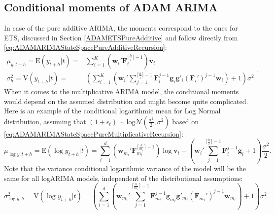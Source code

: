 \documentclass[
]{book}
\theoremstyle{definition}
\theoremstyle{definition}
\theoremstyle{definition}
\theoremstyle{definition}
\theoremstyle{remark}
\begin{document}
\hypertarget{ADAMARIMARecursiveMoments}{%
\subsection{Conditional moments of ADAM ARIMA}\label{ADAMARIMARecursiveMoments}}

In case of the pure additive ARIMA, the moments correspond to the ones for ETS, discussed in Section \ref{ADAMETSPureAdditive} and follow directly from \eqref{eq:ADAMARIMAStateSpacePureAdditiveRecursion}:
\begin{equation*}
  \begin{aligned}
    \mu_{y,t+h} = \mathrm{E}(y_{t+h}|t) = & \sum_{i=1}^K \left(\mathbf{w}_{i}' \mathbf{F}_{i}^{\lceil\frac{h}{i}\rceil-1} \right) \mathbf{v}_{t} \\
    \sigma^2_{h} = \mathrm{V}(y_{t+h}|t) = & \left( \sum_{i=1}^K \left(\mathbf{w}_{i}' \sum_{j=1}^{\lceil\frac{h}{i}\rceil-1} \mathbf{F}_{i}^{j-1} \mathbf{g}_{i} \mathbf{g}'_{i} (\mathbf{F}_{i}')^{j-1} \mathbf{w}_{i} \right) + 1 \right) \sigma^2
  \end{aligned} .
\end{equation*}
When it comes to the multiplicative ARIMA model, the conditional moments would depend on the assumed distribution and might become quite complicated. Here is an example of the conditional logarithmic mean for Log Normal distribution, assuming that \((1+\epsilon_t) \sim \mathrm{log}\mathcal{N}\left(\frac{\sigma^2}{2},\sigma^2 \right)\) based on \eqref{eq:ADAMARIMAStateSpacePureMultiplicativeRecursion}:
\begin{equation}
    \mu_{\log y,t+h} = \mathrm{E}(\log y_{t+h}|t) = \sum_{i=1}^d \left(\mathbf{w}_{m_i}' \mathbf{F}_{m_i}^{\lceil\frac{h}{m_i}\rceil-1} \right) \log \mathbf{v}_{t} -\left(\mathbf{w}_{i}' \sum_{j=1}^{\lceil\frac{h}{i}\rceil-1} \mathbf{F}_{i}^{j-1} \mathbf{g}_{i} + 1\right) \frac{\sigma^2}{2} .
  \label{eq:ADAMARIMAMultiplicativeMeanLogN}
\end{equation}
Note that the variance conditional logarithmic variance of the model will be the same for all logARIMA models, independent of the distributional assumptions:
\begin{equation}
    \sigma^2_{\log y,h} = \mathrm{V}(\log y_{t+h}|t) = \left( \sum_{i=1}^d \left(\mathbf{w}_{m_i}' \sum_{j=1}^{\lceil\frac{h}{m_i}\rceil-1} \mathbf{F}_{m_i}^{j-1} \mathbf{g}_{m_i} \mathbf{g}'_{m_i} (\mathbf{F}_{m_i}')^{j-1} \mathbf{w}_{m_i} \right) + 1 \right) \sigma^2 .
  \label{eq:ADAMARIMAMultiplicativeVarianceLogN}
\end{equation}
\end{document}
